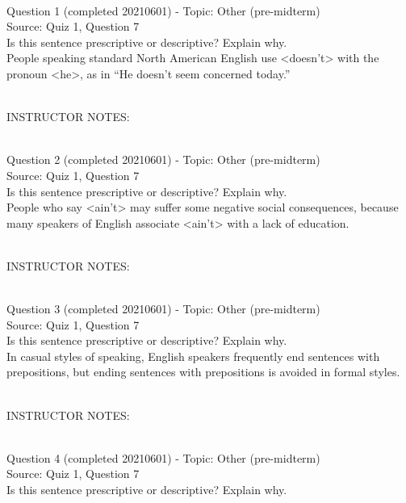\documentclass[12pt]{article}
\begin{document}
~\\

{\large Question 1} (completed 20210601) - Topic: Other (pre-midterm)\\
Source: Quiz 1, Question 7\\

Is this sentence prescriptive or descriptive? Explain why.\\

People speaking standard North American English use <doesn't> with the pronoun <he>, as in ``He doesn't seem concerned today.''


~\\
INSTRUCTOR NOTES: 


~\\

{\large Question 2} (completed 20210601) - Topic: Other (pre-midterm)\\
Source: Quiz 1, Question 7\\

Is this sentence prescriptive or descriptive? Explain why.\\

People who say <ain't> may suffer some negative social consequences, because many speakers of English associate <ain't> with a lack of education.


~\\
INSTRUCTOR NOTES: 


~\\

{\large Question 3} (completed 20210601) - Topic: Other (pre-midterm)\\
Source: Quiz 1, Question 7\\

Is this sentence prescriptive or descriptive? Explain why.\\

In casual styles of speaking, English speakers frequently end sentences with prepositions, but ending sentences with prepositions is avoided in formal styles.


~\\
INSTRUCTOR NOTES: 


~\\

{\large Question 4} (completed 20210601) - Topic: Other (pre-midterm)\\
Source: Quiz 1, Question 7\\

Is this sentence prescriptive or descriptive? Explain why.\\
\end{document}

